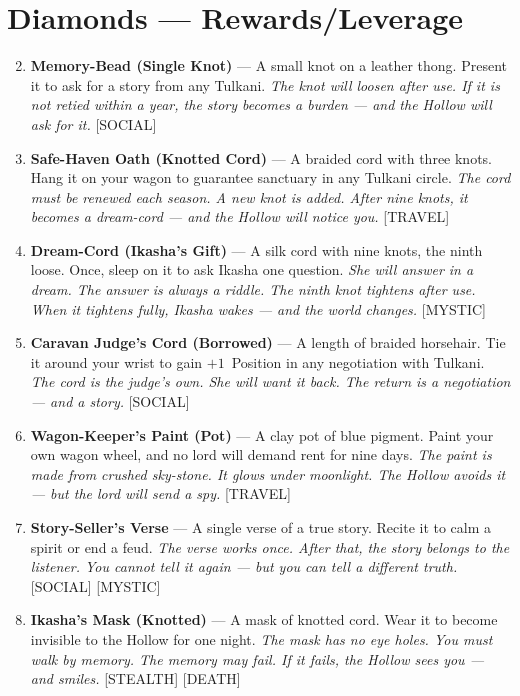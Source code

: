 \section*{Diamonds --- Rewards/Leverage}
\label{sec:tulkani-rewards}
\begin{enumerate}
\setcounter{enumi}{1}
\item \textbf{Memory-Bead (Single Knot)} --- A small knot on a leather thong. Present it to ask for a story from any Tulkani.
  \hfill \textit{The knot will loosen after use. If it is not retied within a year, the story becomes a burden --- and the Hollow will ask for it.} [SOCIAL]
\item \textbf{Safe-Haven Oath (Knotted Cord)} --- A braided cord with three knots. Hang it on your wagon to guarantee sanctuary in any Tulkani circle.
  \hfill \textit{The cord must be renewed each season. A new knot is added. After nine knots, it becomes a dream-cord --- and the Hollow will notice you.} [TRAVEL]
\item \textbf{Dream-Cord (Ikasha's Gift)} --- A silk cord with nine knots, the ninth loose. Once, sleep on it to ask Ikasha one question.
  \hfill \textit{She will answer in a dream. The answer is always a riddle. The ninth knot tightens after use. When it tightens fully, Ikasha wakes --- and the world changes.} [MYSTIC]
\item \textbf{Caravan Judge's Cord (Borrowed)} --- A length of braided horsehair. Tie it around your wrist to gain $+1$~Position in any negotiation with Tulkani.
  \hfill \textit{The cord is the judge's own. She will want it back. The return is a negotiation --- and a story.} [SOCIAL]
\item \textbf{Wagon-Keeper's Paint (Pot)} --- A clay pot of blue pigment. Paint your own wagon wheel, and no lord will demand rent for nine days.
  \hfill \textit{The paint is made from crushed sky-stone. It glows under moonlight. The Hollow avoids it --- but the lord will send a spy.} [TRAVEL]
\item \textbf{Story-Seller's Verse} --- A single verse of a true story. Recite it to calm a spirit or end a feud.
  \hfill \textit{The verse works once. After that, the story belongs to the listener. You cannot tell it again --- but you can tell a different truth.} [SOCIAL] [MYSTIC]
\item \textbf{Ikasha's Mask (Knotted)} --- A mask of knotted cord. Wear it to become invisible to the Hollow for one night.
  \hfill \textit{The mask has no eye holes. You must walk by memory. The memory may fail. If it fails, the Hollow sees you --- and smiles.} [STEALTH] [DEATH]

\end{enumerate}
